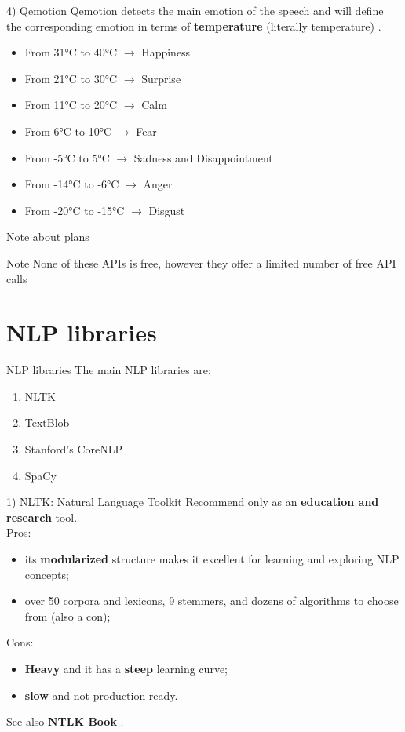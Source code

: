 \documentclass[xcolor=dvipsnames]{beamer}
\begin{document}
\begin{frame}{4) Qemotion}
Qemotion detects the main emotion of the speech and will define the corresponding emotion in terms of \textbf{temperature} (literally temperature) \cite{p5}.
\begin{itemize}
\item From \ang{31}C to \ang{40}C $\rightarrow$ Happiness
\item From \ang{21}C to \ang{30}C $\rightarrow$ Surprise
\item From \ang{11}C to \ang{20}C $\rightarrow$ Calm
\item From \ang{6}C to \ang{10}C $\rightarrow$ Fear
\item From \ang{-5}C to \ang{5}C $\rightarrow$ Sadness and Disappointment
\item From \ang{-14}C to \ang{-6}C $\rightarrow$ Anger
\item From \ang{-20}C to \ang{-15}C $\rightarrow$ Disgust
\end{itemize}
\end{frame}

\begin{frame}{Note about plans}
\begin{block}{Note}
None of these APIs is free, however they offer a limited number of free API calls
\end{block}
\end{frame}

\section{NLP libraries}

\begin{frame}{NLP libraries}
The main NLP libraries are:
\begin{enumerate}
\item NLTK
\item TextBlob
\item Stanford's CoreNLP
\item SpaCy
\end{enumerate}
\end{frame}

\begin{frame}{1) NLTK: Natural Language Toolkit}
Recommend only as an \textbf{education and research} tool.\\
Pros:
\begin{itemize}
\item its \textbf{modularized} structure makes it excellent for learning and exploring NLP concepts;
\item over 50 corpora and lexicons, 9 stemmers, and dozens of algorithms to choose from (also a con);
\end{itemize}
Cons:
\begin{itemize}
\item \textbf{Heavy} and it has a \textbf{steep} learning curve;
\item \textbf{slow} and not production-ready.
\end{itemize}
See also \textbf{NTLK Book} \cite{p6}.
\end{frame}
\end{document}
